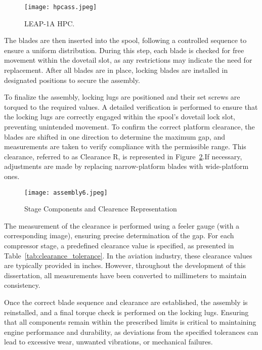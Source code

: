 \begin{figure}[H]
    \centering
    \texttt{[image: hpcass.jpeg]}
    \caption{\gls{LEAP}-1A \gls{HPC}.}
    \label{fig:hpcass}
\end{figure}


The blades are then inserted into the spool, following a controlled sequence to ensure a uniform distribution. During this step, each blade is checked for free movement within the dovetail slot, as any restrictions may indicate the need for replacement. After all blades are in place, locking blades are installed in designated positions to secure the assembly.

To finalize the assembly, locking lugs are positioned and their set screws are torqued to the required values. A detailed verification is performed to ensure that the locking lugs are correctly engaged within the spool’s dovetail lock slot, preventing unintended movement. To confirm the correct platform clearance, the blades are shifted in one direction to determine the maximum gap, and measurements are taken to verify compliance with the permissible range. This clearance, referred to as Clearance R, is represented in Figure~\ref{fig:assembly6}.If necessary, adjustments are made by replacing narrow-platform blades with wide-platform ones.

\begin{figure}[H]
    \centering
    \texttt{[image: assembly6.jpeg]}
    \caption{Stage Components and Clearence Representation}
    \label{fig:assembly6}
\end{figure}


The measurement of the clearance is performed using a feeler gauge (with a corresponding image), ensuring precise determination of the gap. For each compressor stage, a predefined clearance value is specified, as presented in Table~\ref{tab:clearance_tolerance}. In the aviation industry, these clearance values are typically provided in inches. However, throughout the development of this dissertation, all measurements have been converted to millimeters to maintain consistency.

Once the correct blade sequence and clearance are established, the assembly is reinstalled, and a final torque check is performed on the locking lugs. Ensuring that all components remain within the prescribed limits is critical to maintaining engine performance and durability, as deviations from the specified tolerances can lead to excessive wear, unwanted vibrations, or mechanical failures.

